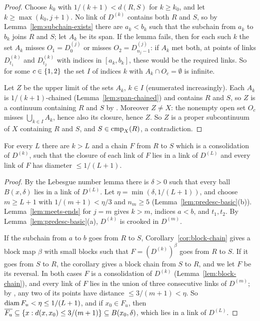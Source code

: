 \begin{proof}
Choose $k_0$ with $1/(k+1)<d(R,S)$ for $k\ge k_0$, and let $k\ge\max(k_0,j+1)$. No link of $D^{(k)}$ contains both $R$ and $S$, so by
Lemma~\ref{lem:subchain-exists} there are $a_k<b_k$ such that the subchain from $a_k$ to $b_k$ joins $R$ and $S$; let $A_k$ be its span. If the
lemma fails, then for each such $k$ the set $A_k$ misses $O_1=D^{(j)}_0$ or misses $O_2=D^{(j)}_{n_j-1}$: if $A_k$ met both, at points of
links $D^{(k)}_{t_1}$ and $D^{(k)}_{t_2}$ with indices in $[a_k,b_k]$, these would be the required links. So for some $c\in\left\{ 1,2 \right\}$ the set
$I$ of indices $k$ with $A_k\cap O_c=\emptyset$ is infinite.

Let $Z$ be the upper limit of the sets $A_k$, $k\in I$ (enumerated increasingly). Each $A_k$ is $1/(k+1)$-chained (Lemma~\ref{lem:span-chained})
and contains $R$ and $S$, so $Z$ is a continuum containing $R$ and $S$ by . Moreover $Z\ne X$: the nonempty open set $O_c$ misses
$\bigcup_{k\in I}A_k$, hence also its closure, hence $Z$. So $Z$ is a proper subcontinuum of $X$ containing $R$ and $S$, and $S\in\operatorname{cmp}_{X}(R)$, a
contradiction.
\end{proof}


\begin{lemma}\label{lem:desc-step}
For every $L$ there are $k>L$ and a chain $F$ from $R$ to $S$ which is a consolidation of $D^{(k)}$, such that the closure of each link of
$F$ lies in a link of $D^{(L)}$ and every link of $F$ has diameter $\le1/(L+1)$.
\end{lemma}

\begin{proof}
By the Lebesgue number lemma there is $\delta>0$ such that every ball $B(x,\delta)$ lies in a link of $D^{(L)}$. Let
$\eta=\min(\delta,1/(L+1))$, and choose $m\ge L+1$ with $1/(m+1)<\eta/3$ and $n_m\ge5$ (Lemma~\ref{lem:predesc-basic}(b)). Lemma~\ref{lem:meets-ends}
for $j=m$ gives $k>m$, indices $a<b$, and $t_1,t_2$. By Lemma~\ref{lem:predesc-basic}(a), $D^{(k)}$ is crooked in $D^{(m)}$.

If the subchain from $a$ to $b$ goes from $R$ to $S$, Corollary~\ref{cor:block-chain} gives a block map $\beta$ with small blocks such that
$F=(D^{(k)})^\beta$ goes from $R$ to $S$. If it goes from $S$ to $R$, the corollary gives a block chain from $S$ to $R$, and we let $F$ be its
reversal. In both cases $F$ is a consolidation of $D^{(k)}$ (Lemma~\ref{lem:block-chain}), and every link of $F$ lies in the union of three
consecutive links of $D^{(m)}$; by , any two of its points have distance $\le3/(m+1)<\eta$. So $\operatorname{diam} F_u<\eta\le1/(L+1)$,
and if $x_0\in F_u$, then $\overline{F_u}\subseteq\left\{ x:d(x,x_0)\le3/(m+1) \right\}\subseteq B(x_0,\delta)$, which lies in a link of $D^{(L)}$.
\end{proof}

